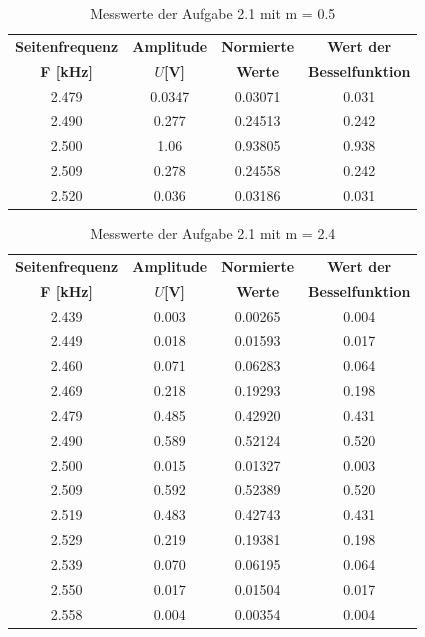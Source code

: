 \documentclass[12pt]{scrartcl}
\begin{document}
 \begin{table}[H] 
     \centering
     \begin{tabular}{|c|c|c|c|} 
           \hline \textbf{Seitenfrequenz} & \textbf{Amplitude} & \textbf{Normierte }& \textbf{Wert der } \\ 
           \textbf{ F [kHz]}    & \textbf{$U$[V]}  & \textbf{Werte}  &  \textbf{Besselfunktion}   \\ \hline
     2.479 & 0.0347 & 0.03071 & 0.031 \\ \hline
2.490 & 0.277  & 0.24513 & 0.242 \\ \hline  
2.500 & 1.06   & 0.93805 & 0.938 \\ \hline  
2.509 & 0.278  & 0.24558 & 0.242 \\ \hline
2.520 & 0.036  & 0.03186 & 0.031 \\ \hline
     \end{tabular}
     \caption{Messwerte der Aufgabe 2.1 mit m = 0.5 } \label{tab:Aufgabe2.1_m=0.5}
 \end{table}

 \begin{table}[H] 
     \centering
\begin{tabular}{|c|c|c|c|} 
           \hline \textbf{Seitenfrequenz} & \textbf{Amplitude} & \textbf{Normierte }& \textbf{Wert der } \\ 
           \textbf{ F [kHz]}    & \textbf{$U$[V]}  & \textbf{Werte}  &  \textbf{Besselfunktion}   \\ \hline
2.439 &  0.003 & 0.00265 & 0.004  \\ \hline
2.449 &  0.018 & 0.01593 & 0.017  \\ \hline
2.460 &  0.071 & 0.06283 & 0.064  \\ \hline
2.469 &  0.218 & 0.19293 & 0.198  \\ \hline
2.479 &  0.485 & 0.42920 & 0.431  \\ \hline
2.490 &  0.589 & 0.52124 & 0.520  \\ \hline
2.500 &  0.015 & 0.01327 & 0.003  \\ \hline
2.509 &  0.592 & 0.52389 & 0.520  \\ \hline
2.519 &  0.483 & 0.42743 & 0.431  \\ \hline
2.529 &  0.219 & 0.19381 & 0.198  \\ \hline
2.539 &  0.070 & 0.06195 & 0.064  \\ \hline
2.550 &  0.017 & 0.01504 & 0.017  \\ \hline
2.558 &  0.004 & 0.00354 & 0.004  \\ \hline
     \end{tabular}
     \caption{Messwerte der Aufgabe 2.1 mit m = 2.4 } \label{tab:Aufgabe2.1_m=2.4}
 \end{table}
\end{document}
